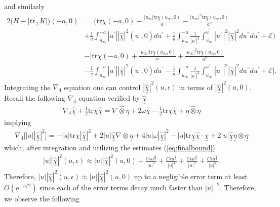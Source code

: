 \documentclass{amsart}
\newcommand{\chihat}{\hat{\chi}}
\newcommand{\chibar}{\underline{\chi}}
\newcommand{\chibarhat}{\underline{\hat{\chi}}}
\newcommand{\etabar}{\underline{\eta}}
\newcommand{\tr}{\mbox{tr}}
\begin{document}
and similarly
\begin{align}
2\bigg(H-|\tr_{\Sigma}K|\bigg)(-a,0)
&=\bigg(\tr\chi(-a,0)-\frac{|u_{\infty}|\tr\chibar(u_{\infty},0)}{a}-\frac{|u_{\infty}|^{2}\widetilde{\tr\chibar}(u_{\infty},0)}{a^{2}}\\\nonumber
&+\frac{1}{a}\int_{u_{\infty}}^{-a}|u^{'}||\chibarhat|^{2}(u^{'},0)du^{'}+\frac{1}{a}\int_{u_{\infty}}^{-a}\frac{1}{|u^{'}|^{2}}\int_{u_{\infty}}^{u^{'}}|u^{''}|^{2}|\chibarhat|^{2}du^{''}du^{'}+\mathscr{E}\bigg)\\\nonumber
&-\bigg|\tr\chi(-a,0)+\frac{|u_{\infty}|\tr\chibar(u_{\infty},0)}{a}+\frac{|u_{\infty}|^{2}\widetilde{\tr\chibar}(u_{\infty},0)}{a^{2}}\\\nonumber
&-\frac{1}{a}\int_{u_{\infty}}^{-a}|u^{'}||\chibarhat|^{2}(u^{'},0)du^{'}-\frac{1}{a}\int_{u_{\infty}}^{-a}\frac{1}{|u^{'}|^{2}}\int_{u_{\infty}}^{u^{'}}|u^{''}|^{2}|\chibarhat|^{2}du^{''}du^{'}+\mathscr{E}\bigg|.     
\end{align}
Integrating the $\nabla_{4}$ equation one can control $|\chibarhat|^{2}(u,\epsilon)$ in terms of $|\chibarhat|^{2}(u,0)$. Recall the following $\nabla_{4}$ equation verified by $\chibarhat$
\begin{align}
\nabla_{4}\hat{\underline{\chi}}+\frac{1}{2}\tr\chi\hat{\underline{\chi}}=\nabla\hat{\otimes}\underline{\eta}+2\omega\hat{\underline{\chi}}-\frac{1}{2}\tr\underline{\chi}\hat{\chi}+\underline{\eta}\hat{\otimes}\underline{\eta}    
\end{align}
implying 
\begin{align}
 \nabla_{4}\bigg[|u||\chibarhat|^{2}\bigg]=-|u|\tr\chi|\chibarhat|^{2}+2|u|\chibarhat\nabla\otimes \etabar+4|u|\omega|\chibarhat|^{2}-|u|\tr\chibar\chihat\cdot\chibarhat+2|u|\chibarhat\etabar\otimes\etabar   
\end{align}
which, after integration and utilizing the estimates (\ref{eq:finalbound})
\begin{align}
 |u||\chibarhat|^{2}(u,\epsilon)\approx |u||\chibarhat|^{2}(u,0)+\frac{C\epsilon a^{\frac{3}{2}}}{|u|^{4}}+\frac{C\epsilon a^{\frac{3}{4}}}{|u|^{4}}+\frac{C\epsilon a^{\frac{3}{4}}}{|u|^{3}}+\frac{C\epsilon a^{\frac{7}{4}}}{|u|^{5}}.   
\end{align}
Therefore,  $|u||\chibarhat|^{2}(u,\epsilon)\approx |u||\chibarhat|^{2}(u,0)$ up to a negligible error term at least $O(a^{-5/2})$ since each of the error terms decay much faster than $|u|^{-2}$. Therefore, we observe the following 
\end{document}
